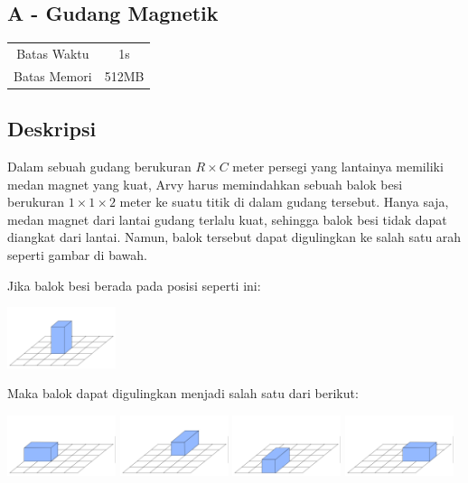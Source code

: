 \documentclass{article}
\begin{document}
\begin{center}
    \section*{A - Gudang Magnetik}

    \begin{tabular}{ | c c | }
        \hline
        Batas Waktu  & 1s \\
        Batas Memori & 512MB \\
        \hline
    \end{tabular}
\end{center}

\subsection*{Deskripsi}
Dalam sebuah gudang berukuran $R \times C$ meter persegi yang lantainya memiliki medan magnet yang kuat, Arvy harus memindahkan sebuah balok besi berukuran $1 \times 1 \times 2$ meter ke suatu titik di dalam gudang tersebut.
Hanya saja, medan magnet dari lantai gudang terlalu kuat, sehingga balok besi tidak dapat diangkat dari lantai.
Namun, balok tersebut dapat digulingkan ke salah satu arah seperti gambar di bawah.

Jika balok besi berada pada posisi seperti ini:

\begin{center}
    \includegraphics[width=120px]{balok-1-awal}
\end{center}

Maka balok dapat digulingkan menjadi salah satu dari berikut:

\includegraphics[width=120px]{balok-1-kiri}
\includegraphics[width=120px]{balok-1-belakang}
\includegraphics[width=120px]{balok-1-depan}
\includegraphics[width=120px]{balok-1-kanan}
\end{document}
